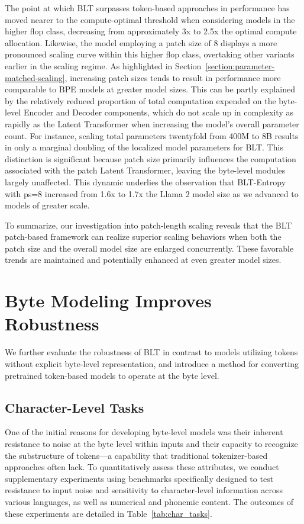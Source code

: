 The point at which {\textsc BLT} surpasses token-based approaches in performance has moved nearer to the compute-optimal threshold when considering models in the higher flop class, decreasing from approximately 3x to 2.5x the optimal compute allocation. Likewise, the model employing a patch size of 8 displays a more pronounced scaling curve within this higher flop class, overtaking other variants earlier in the scaling regime. As highlighted in Section~\ref{section:parameter-matched-scaling}, increasing patch sizes tends to result in performance more comparable to BPE models at greater model sizes. This can be partly explained by the relatively reduced proportion of total computation expended on the byte-level Encoder and Decoder components, which do not scale up in complexity as rapidly as the Latent Transformer when increasing the model's overall parameter count. For instance, scaling total parameters twentyfold from 400M to 8B results in only a marginal doubling of the localized model parameters for {\textsc BLT}. This distinction is significant because patch size primarily influences the computation associated with the patch Latent Transformer, leaving the byte-level modules largely unaffected. This dynamic underlies the observation that {\textsc BLT}-Entropy with ps=8 increased from 1.6x to 1.7x the Llama 2 model size as we advanced to models of greater scale.

To summarize, our investigation into patch-length scaling reveals that the {\textsc BLT} patch-based framework can realize superior scaling behaviors when both the patch size and the overall model size are enlarged concurrently. These favorable trends are maintained and potentially enhanced at even greater model sizes.

\section{Byte Modeling Improves Robustness} We further evaluate the robustness of {\textsc BLT} in contrast to models utilizing tokens without explicit byte-level representation, and introduce a method for converting pretrained token-based models to operate at the byte level.
\label{sec:robustness}

\subsection{Character-Level Tasks}

One of the initial reasons for developing byte-level models was their inherent resistance to noise at the byte level within inputs and their capacity to recognize the substructure of tokens—a capability that traditional tokenizer-based approaches often lack. To quantitatively assess these attributes, we conduct supplementary experiments using benchmarks specifically designed to test resistance to input noise and sensitivity to character-level information across various languages, as well as numerical and phonemic content. The outcomes of these experiments are detailed in Table~\ref{tab:char_tasks}.

